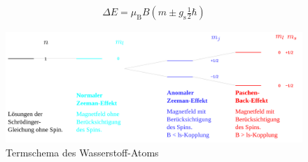 \documentclass[numbers=noenddot,12pt,a4paper]{scrartcl}
\newcommand{\ix}[1]{_\text{#1}}
\begin{document}
\begin{align}
	\Delta E=\mu\ix{B}B\left(m\pm g\ix{s}\frac{1}{2}\hbar\right)
\end{align}
\begin{figure}[H]
	\centering
	\includegraphics[width=\textwidth]{Wasserstoff_Zeeman.png}
	\caption{Termschema des Wasserstoff-Atoms}
\end{figure}
\end{document}
